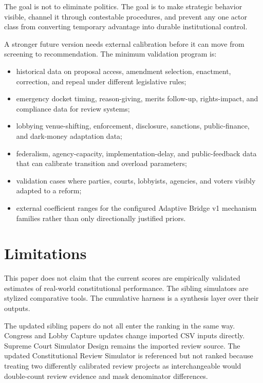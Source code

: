 \documentclass[11pt]{article}
\providecommand{\GeneratedDir}{generated}
\begin{document}




The goal is not to eliminate politics. The goal is to make strategic behavior visible, channel it through contestable procedures, and prevent any one actor class from converting temporary advantage into durable institutional control.

A stronger future version needs external calibration before it can move from screening to recommendation. The minimum validation program is:

\begin{itemize}
  \item historical data on proposal access, amendment selection, enactment, correction, and repeal under different legislative rules;
  \item emergency docket timing, reason-giving, merits follow-up, rights-impact, and compliance data for review systems;
  \item lobbying venue-shifting, enforcement, disclosure, sanctions, public-finance, and dark-money adaptation data;
  \item federalism, agency-capacity, implementation-delay, and public-feedback data that can calibrate transition and overload parameters;
  \item validation cases where parties, courts, lobbyists, agencies, and voters visibly adapted to a reform;
  \item external coefficient ranges for the configured Adaptive Bridge v1 mechanism families rather than only directionally justified priors.
\end{itemize}

\section{Limitations}

This paper does not claim that the current scores are empirically validated estimates of real-world constitutional performance. The sibling simulators are stylized comparative tools. The cumulative harness is a synthesis layer over their outputs.

The updated sibling papers do not all enter the ranking in the same way. Congress and Lobby Capture updates change imported CSV inputs directly. Supreme Court Simulator Design remains the imported review source. The updated Constitutional Review Simulator is referenced but not ranked because treating two differently calibrated review projects as interchangeable would double-count review evidence and mask denominator differences.
\end{document}
